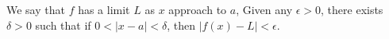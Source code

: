 \documentclass[preview]{standalone}
\begin{document}
\begin{center}
We say that $f$ has a limit $L$ as $x$ approach to $a$, Given any $\epsilon > 0$, there exists $\delta > 0$ such that if $0 < |x - a| < \delta$, then $|f(x) - L| < \epsilon$.
\end{center}
\end{document}
